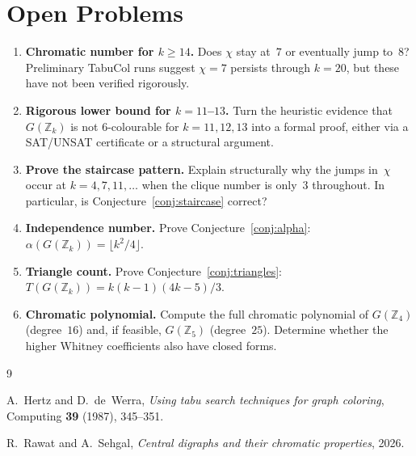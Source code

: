 \documentclass[12pt]{article}
\theoremstyle{definition}
\theoremstyle{remark}
\newcommand{\Z}{\mathbb{Z}}
\newcommand{\GZk}{G(\Z_k)}
\begin{document}
\section{Open Problems}
\label{sec:open}

\begin{enumerate}
  \item \textbf{Chromatic number for $k \ge 14$.}  Does $\chi$ stay at~$7$
    or eventually jump to~$8$?  Preliminary TabuCol runs suggest $\chi = 7$
    persists through $k = 20$, but these have not been verified rigorously.

  \item \textbf{Rigorous lower bound for $k = 11$--$13$.}  Turn the heuristic
    evidence that $\GZk$ is not $6$-colourable for $k = 11, 12, 13$ into a
    formal proof, either via a SAT/UNSAT certificate or a structural argument.

  \item \textbf{Prove the staircase pattern.}  Explain structurally why the
    jumps in~$\chi$ occur at $k = 4, 7, 11, \ldots$ when the clique number
    is only~$3$ throughout.  In particular, is
    Conjecture~\ref{conj:staircase} correct?

  \item \textbf{Independence number.}  Prove
    Conjecture~\ref{conj:alpha}: $\alpha(\GZk) = \lfloor k^2/4 \rfloor$.

  \item \textbf{Triangle count.}  Prove
    Conjecture~\ref{conj:triangles}: $T(\GZk) = k(k{-}1)(4k{-}5)/3$.

  \item \textbf{Chromatic polynomial.}  Compute the full chromatic polynomial
    of $G(\Z_4)$ (degree~$16$) and, if feasible, $G(\Z_5)$ (degree~$25$).
    Determine whether the higher Whitney coefficients also have closed forms.
\end{enumerate}


\begin{thebibliography}{9}

A.~Hertz and D.~de~Werra,
\emph{Using tabu search techniques for graph coloring},
Computing \textbf{39} (1987), 345--351.

R.~Rawat and A.~Sehgal,
\emph{Central digraphs and their chromatic properties},
2026.

\end{thebibliography}
\end{document}
